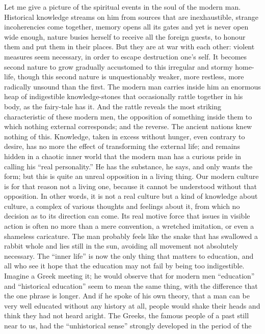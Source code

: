 Let me give a picture of the spiritual events in the soul of the
modern man. Historical knowledge streams on him from sources that are
inexhaustible, strange incoherencies come together, memory opens all
its gates and yet is never open wide enough, nature busies herself to
receive all the foreign guests, to honour them and put them in their
places. But they are at war with each other: violent measures seem
necessary, in order to escape destruction one's self. It becomes
second nature to grow gradually accustomed to this irregular and
stormy home-life, though this second nature is unquestionably weaker,
more restless, more radically unsound than the first. The modern man
carries inside him an enormous heap of indigestible knowledge-stones
that occasionally rattle together in his body, as the fairy-tale has
it. And the rattle reveals the most striking characteristic of these
modern men, the opposition of something inside them to which nothing
external corresponds; and the reverse. The ancient nations knew
nothing of this. Knowledge, taken in excess without hunger, even
contrary to desire, has no more the effect of transforming the
external life; and remains hidden in a chaotic inner world that the
modern man has a curious pride in calling his \enquote{real personality.} He
has the substance, he says, and only wants the form; but this is
quite an unreal opposition in a living thing. Our modern culture is
for that reason not a living one, because it cannot be understood
without that opposition. In other words, it is not a real culture but
a kind of knowledge about culture, a complex of various thoughts and
feelings about it, from which no decision as to its direction can
come. Its real motive force that issues in visible action is often no
more than a mere convention, a wretched imitation, or even a
shameless caricature. The man probably feels like the snake that has
swallowed a rabbit whole and lies still in the sun, avoiding all
movement not absolutely necessary. The \enquote{inner life} is now the only
thing that matters to education, and all who see it hope that the
education may not fail by being too indigestible. Imagine a Greek
meeting it; he would observe that for modern men \enquote{education} and
\enquote{historical education} seem to mean the same thing, with the
difference that the one phrase is longer. And if he spoke of his own
theory, that a man can be very well educated without any history at
all, people would shake their heads and think they had not heard
aright. The Greeks, the famous people of a past still near to us, had
the \enquote{unhistorical sense} strongly developed in the period of the
